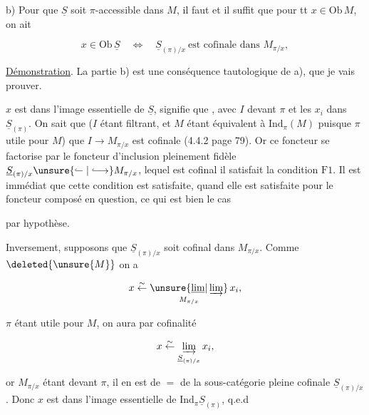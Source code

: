 b) Pour que $\underline S$ soit $\pi$-accessible dans $M$, il faut et il suffit que pour tt $x\in\mathrm{Ob}\,M$, on ait

\[x\in\mathrm{Ob}\,\underline S\quad\Longleftrightarrow\quad\underline S_{(\pi)/x}\ \text{est cofinale dans }M_{\pi/x},\]


\uline{Démonstration}. La partie b) est une conséquence tautologique de a), que je vais prouver.

 $x$  est dans l'image essentielle de $\underline S$, signifie que , avec $I$  devant $\pi$ et les $x_i$ dans $\underline S_{(\pi)}$. On sait que    ($I$ étant filtrant, et $M$ étant équivalent à $\mathrm{Ind}_\pi(M)$ puisque $\pi$ utile pour $M$) que $I\longrightarrow M_{\pi/x}$ est cofinale (4.4.2 page 79). Or ce foncteur se factorise par le foncteur d'inclusion pleinement fidèle $\underline S_{(\pi)/x}\unsure{\lhook\joinrel\relbar|\lhook\joinrel\longrightarrow} M_{\pi/x}$, lequel est cofinal  il satisfait la condition $\mathrm{F}1$. Il est immédiat que cette condition est satisfaite, quand elle est satisfaite pour le foncteur composé en question, ce qui est bien le cas



par hypothèse.

Inversement, supposons que $\underline S_{(\pi)/x}$ soit cofinal dans $M_{\pi/x}$. Comme $\deleted{\unsure{M}}$ on a

\[x\overset{\sim}{\leftarrow}\underset{M_{\pi/x}}{\unsure{\underline{\lim}|\varinjlim}}\,x_i,\]

$\pi$ étant utile pour $M$, on aura  par cofinalité

\[x\overset{\sim}{\leftarrow}\underset{\underline S_{(\pi)/x}}{\varinjlim}\,x_i,\]

or $M_{\pi/x}$ étant  devant $\pi$, il en est de $=$ de la sous-catégorie  pleine cofinale $\underline S_{(\pi)/x}$. Donc $x$ est dans l'image essentielle de $\mathrm{Ind}_\pi\underline S_{(\pi)}$, q.e.d

